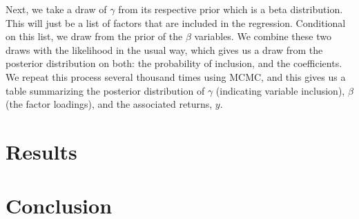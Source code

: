 \documentclass[11pt]{article}
\begin{document}
Next, we take a draw of $\gamma$ from its respective prior which is a beta distribution. This will just be a list of factors that are included in the regression. Conditional on this list, we draw from the prior of the $\beta$ variables. We combine these two draws with the likelihood in the usual way, which gives us a draw from the posterior distribution on both: the probability of inclusion, and the coefficients. We repeat this process several thousand times using MCMC, and this gives us a table summarizing the posterior distribution of $\gamma$ (indicating variable inclusion), $\beta$ (the factor loadings), and the associated returns, $y$.




%
\section{Results} 
\label{sec:results}
%
%
%
%
\section{Conclusion} 
\label{sec:conclusion}


\newpage

\singlespacing
\setlength\bibsep{0pt}



%
%



%
%
%
%
%
%

\end{document}
